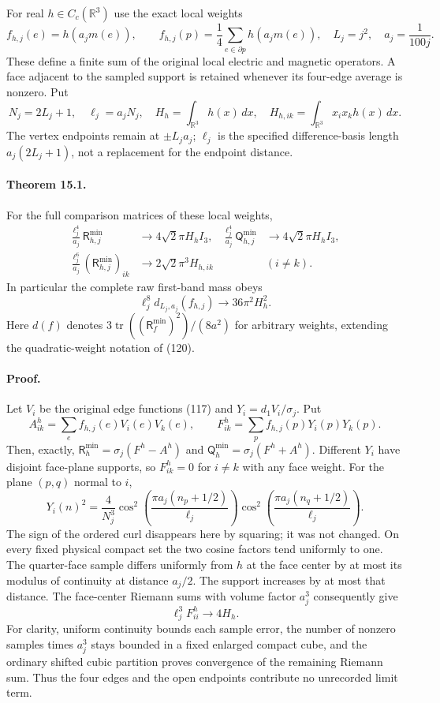 \documentclass[11pt]{article}
\begin{document}
For real $h\in C_c(\mathbb R^3)$ use the exact local weights
\[
 f_{h,j}(e)=h(a_jm(e)),\qquad
 f_{h,j}(p)=\frac14\sum_{e\in\partial p}h(a_jm(e)),
 \quad L_j=j^2,\quad a_j=\frac1{100j}.
\]
These define a finite sum of the original local electric and magnetic
operators. A face adjacent to the sampled support is retained whenever
its four-edge average is nonzero. Put
\[
 N_j=2L_j+1,\quad \ell_j=a_jN_j,\quad
 H_h=\int_{\mathbb R^3}h(x)\,dx,\quad
 H_{h,ik}=\int_{\mathbb R^3}x_ix_kh(x)\,dx.
\]
The vertex endpoints remain at $\pm L_ja_j$; $\ell_j$ is the
specified difference-basis length $a_j(2L_j+1)$, not a replacement
for the endpoint distance.

\paragraph{Theorem 15.1.}
For the full comparison matrices of these local weights,
\begin{align}
 \frac{\ell_j^4}{a_j}\mathsf R_{h,j}^{\min}
 &\longrightarrow4\sqrt2\pi H_h I_3,
 &
 \frac{\ell_j^4}{a_j}\mathsf Q_{h,j}^{\min}
 &\longrightarrow4\sqrt2\pi H_h I_3, \label{eq:local-leading}\\
 \frac{\ell_j^6}{a_j}(\mathsf R_{h,j}^{\min})_{ik}
 &\longrightarrow2\sqrt2\pi^3 H_{h,ik}
 &&(i\ne k). \label{eq:local-quadrupole}
\end{align}
In particular the complete raw first-band mass obeys
\begin{equation}\label{eq:local-mass}
 \ell_j^8d_{L_j,a_j}(f_{h,j})\longrightarrow36\pi^2 H_h^2.
\end{equation}
Here $d(f)$ denotes $3\operatorname{tr}((\mathsf R_f^{\min})^2)/(8a^2)$
for arbitrary weights, extending the quadratic-weight notation of
(120).

\paragraph{Proof.}
Let $V_i$ be the original edge functions (117) and
$Y_i=d_1V_i/\sigma_j$. Put
\[
 A^h_{ik}=\sum_ef_{h,j}(e)V_i(e)V_k(e),\qquad
 F^h_{ik}=\sum_pf_{h,j}(p)Y_i(p)Y_k(p).
\]
Then, exactly,
$\mathsf R_h^{\min}=\sigma_j(F^h-A^h)$ and
$\mathsf Q_h^{\min}=\sigma_j(F^h+A^h)$.
Different $Y_i$ have disjoint face-plane supports, so $F^h_{ik}=0$
for $i\ne k$ with any face weight.
For the plane $(p,q)$ normal to $i$,
\[
 Y_i(n)^2=\frac4{N_j^3}
 \cos^2\left(\frac{\pi a_j(n_p+1/2)}{\ell_j}\right)
 \cos^2\left(\frac{\pi a_j(n_q+1/2)}{\ell_j}\right).
\]
The sign of the ordered curl disappears here by squaring; it was not
changed. On every fixed physical compact set the two cosine factors
tend uniformly to one. The quarter-face sample differs uniformly
from $h$ at the face center by at most its modulus of continuity
at distance $a_j/2$. The support increases by at most that distance.
The face-center Riemann sums with volume factor $a_j^3$ consequently
give
\[
 \ell_j^3 F^h_{ii}\longrightarrow4H_h.
\]
For clarity, uniform continuity bounds each sample error, the number
of nonzero samples times $a_j^3$ stays bounded in a fixed enlarged
compact cube, and the ordinary shifted cubic partition proves
convergence of the remaining Riemann sum. Thus the four edges and
the open endpoints contribute no unrecorded limit term.
\end{document}
